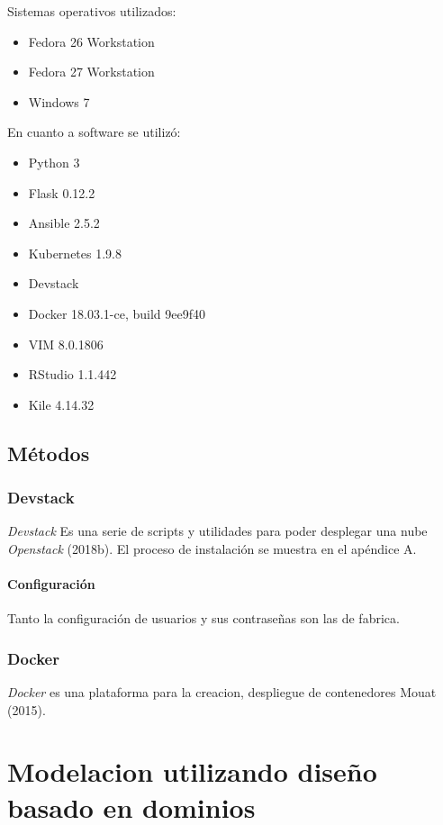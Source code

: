 \documentclass[12pt,twoside]{reedthesis}
\providecommand{\tightlist}{%
  \setlength{\itemsep}{0pt}\setlength{\parskip}{0pt}}
\theoremstyle{definition}
\theoremstyle{definition}
\theoremstyle{definition}
\theoremstyle{remark}
\begin{document}
Sistemas operativos utilizados:
\begin{itemize}
\tightlist
\item
  Fedora 26 Workstation
\item
  Fedora 27 Workstation
\item
  Windows 7
\end{itemize}
En cuanto a software se utilizó:
\begin{itemize}
\tightlist
\item
  Python 3
\item
  Flask 0.12.2
\item
  Ansible 2.5.2
\item
  Kubernetes 1.9.8
\item
  Devstack
\item
  Docker 18.03.1-ce, build 9ee9f40
\item
  VIM 8.0.1806
\item
  RStudio 1.1.442
\item
  Kile 4.14.32
\end{itemize}
\hypertarget{metodos}{%
\section{Métodos}\label{metodos}}

\hypertarget{devstack}{%
\subsection{Devstack}\label{devstack}}

\emph{Devstack} Es una serie de scripts y utilidades para poder
desplegar una nube \emph{Openstack} (2018b). El proceso de instalación
se muestra en el apéndice A.

\hypertarget{configuracion}{%
\subsubsection{Configuración}\label{configuracion}}

Tanto la configuración de usuarios y sus contraseñas son las de fabrica.

\hypertarget{docker}{%
\subsection{Docker}\label{docker}}

\emph{Docker} es una plataforma para la creacion, despliegue de
contenedores Mouat (2015).

\hypertarget{modelacion-utilizando-diseno-basado-en-dominios}{%
\chapter{Modelacion utilizando diseño basado en
dominios}\label{modelacion-utilizando-diseno-basado-en-dominios}}
\end{document}
